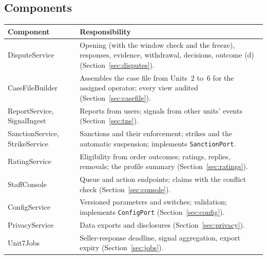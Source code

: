 \documentclass[11pt,a4paper]{article}
\newenvironment{dtable}[1]{\small\begin{longtable}{#1}}{\end{longtable}}
\begin{document}
\subsection{Components}
\begin{dtable}{@{}>{\raggedright\arraybackslash}p{3.8cm}>{\raggedright\arraybackslash}p{11.4cm}@{}}
\toprule
\textbf{Component} & \textbf{Responsibility} \\ \midrule \endhead
DisputeService & Opening (with the window check and the freeze), responses, evidence, withdrawal, decisions, outcome (d) (Section~\ref{sec:disputes}). \\
CaseFileBuilder & Assembles the case file from Units~2 to~6 for the assigned operator; every view audited (Section~\ref{sec:casefile}). \\
ReportService, SignalIngest & Reports from users; signals from other units' events (Section~\ref{sec:tns}). \\
SanctionService, StrikeService & Sanctions and their enforcement; strikes and the automatic suspension; implements \texttt{SanctionPort}. \\
RatingService & Eligibility from order outcomes; ratings, replies, removals; the profile summary (Section~\ref{sec:ratings}). \\
StaffConsole & Queue and action endpoints; claims with the conflict check (Section~\ref{sec:console}). \\
ConfigService & Versioned parameters and switches; validation; implements \texttt{ConfigPort} (Section~\ref{sec:config}). \\
PrivacyService & Data exports and disclosures (Section~\ref{sec:privacy}). \\
Unit7Jobs & Seller-response deadline, signal aggregation, export expiry (Section~\ref{sec:jobs}). \\
\bottomrule
\end{dtable}
\end{document}
